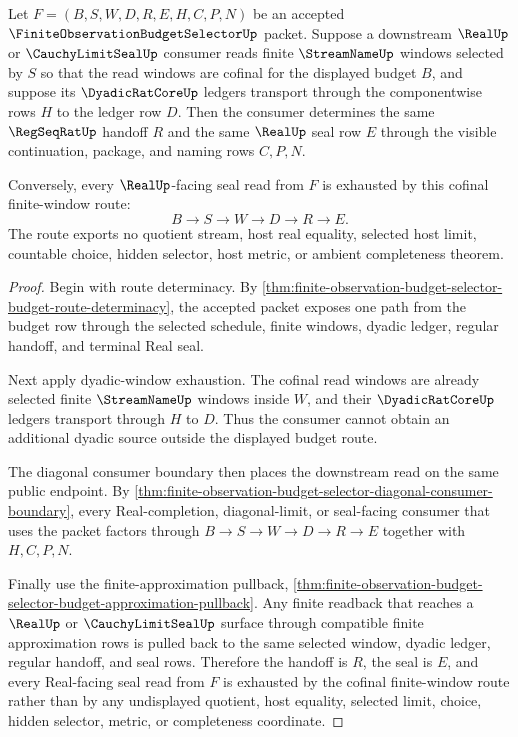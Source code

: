 \begin{theorem}
\label{thm:finite-observation-budget-selector-cofinal-readback}
Let $F=(B,S,W,D,R,E,H,C,P,N)$ be an accepted $\FiniteObservationBudgetSelectorUp$ packet. Suppose a downstream $\RealUp$ or $\CauchyLimitSealUp$ consumer reads finite $\StreamNameUp$ windows selected by $S$ so that the read windows are cofinal for the displayed budget $B$, and suppose its $\DyadicRatCoreUp$ ledgers transport through the componentwise rows $H$ to the ledger row $D$. Then the consumer determines the same $\RegSeqRatUp$ handoff $R$ and the same $\RealUp$ seal row $E$ through the visible continuation, package, and naming rows $C,P,N$.

Conversely, every $\RealUp$-facing seal read from $F$ is exhausted by this cofinal finite-window route:
$$
B \to S \to W \to D \to R \to E.
$$
The route exports no quotient stream, host real equality, selected host limit, countable choice, hidden selector, host metric, or ambient completeness theorem.
\end{theorem}
\begin{proof}
Begin with route determinacy. By \autoref{thm:finite-observation-budget-selector-budget-route-determinacy}, the accepted packet exposes one path from the budget row through the selected schedule, finite windows, dyadic ledger, regular handoff, and terminal Real seal.

Next apply dyadic-window exhaustion. The cofinal read windows are already selected finite $\StreamNameUp$ windows inside $W$, and their $\DyadicRatCoreUp$ ledgers transport through $H$ to $D$. Thus the consumer cannot obtain an additional dyadic source outside the displayed budget route.

The diagonal consumer boundary then places the downstream read on the same public endpoint. By \autoref{thm:finite-observation-budget-selector-diagonal-consumer-boundary}, every Real-completion, diagonal-limit, or seal-facing consumer that uses the packet factors through $B \to S \to W \to D \to R \to E$ together with $H,C,P,N$.

Finally use the finite-approximation pullback, \autoref{thm:finite-observation-budget-selector-budget-approximation-pullback}. Any finite readback that reaches a $\RealUp$ or $\CauchyLimitSealUp$ surface through compatible finite approximation rows is pulled back to the same selected window, dyadic ledger, regular handoff, and seal rows. Therefore the handoff is $R$, the seal is $E$, and every Real-facing seal read from $F$ is exhausted by the cofinal finite-window route rather than by any undisplayed quotient, host equality, selected limit, choice, hidden selector, metric, or completeness coordinate.
\end{proof}

